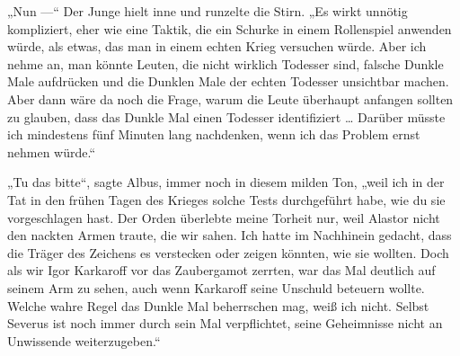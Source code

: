 „Nun —“ Der Junge hielt inne und runzelte die Stirn.
„Es wirkt unnötig kompliziert, eher wie eine Taktik, die ein Schurke in einem Rollenspiel anwenden würde, als etwas, das man in einem echten Krieg versuchen würde. Aber ich nehme an, man könnte Leuten, die nicht wirklich Todesser sind, falsche Dunkle Male aufdrücken und die Dunklen Male der echten Todesser unsichtbar machen. Aber dann wäre da noch die Frage, warum die Leute überhaupt anfangen sollten zu glauben, dass das Dunkle Mal einen Todesser identifiziert … Darüber müsste ich mindestens fünf Minuten lang nachdenken, wenn ich das Problem ernst nehmen würde.“

„Tu das bitte“, sagte Albus, immer noch in diesem milden Ton, „weil ich in der Tat in den frühen Tagen des Krieges solche Tests durchgeführt habe, wie du sie vorgeschlagen hast. Der Orden überlebte meine Torheit nur, weil Alastor nicht den nackten Armen traute, die wir sahen. Ich hatte im Nachhinein gedacht, dass die Träger des Zeichens es verstecken oder zeigen könnten, wie sie wollten. Doch als wir Igor Karkaroff vor das Zaubergamot zerrten, war das Mal deutlich auf seinem Arm zu sehen, auch wenn Karkaroff seine Unschuld beteuern wollte. Welche wahre Regel das Dunkle Mal beherrschen mag, weiß ich nicht. Selbst Severus ist noch immer durch sein Mal verpflichtet, seine Geheimnisse nicht an Unwissende weiterzugeben.“

